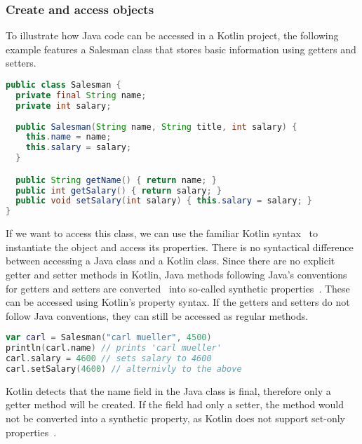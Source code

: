 \documentclass[a4paper,11pt]{article}
\begin{document}
\subsubsection{Create and access objects}
To illustrate how Java code can be accessed in a Kotlin project, the following example features a Salesman class that stores basic information using getters and setters.
\begin{lstlisting}[language=Java,title={Example Java class}]
public class Salesman {
  private final String name;
  private int salary;
  
  public Salesman(String name, String title, int salary) {
    this.name = name;
    this.salary = salary;
  }

  public String getName() { return name; }
  public int getSalary() { return salary; }
  public void setSalary(int salary) { this.salary = salary; }
}
\end{lstlisting}
If we want to access this class, we can use the familiar Kotlin syntax~\cite{interop} to instantiate the object and access its properties. There is no syntactical difference between accessing a Java class and a Kotlin class. Since there are no explicit getter and setter methods in Kotlin, Java methods following Java's conventions for getters and setters are converted~\cite{interop-getter-setter} into so-called synthetic properties~\cite{interop-synthetic-property}. These can be accessed using Kotlin’s property syntax. If the getters and setters do not follow Java conventions, they can still be accessed as regular methods.
\begin{lstlisting}[language=Kotlin, title={Access a Salesman instance in Kotlin}]
var carl = Salesman("carl mueller", 4500)
println(carl.name) // prints 'carl mueller'
carl.salary = 4600 // sets salary to 4600
carl.setSalary(4600) // alternivly to the above
\end{lstlisting}
Kotlin detects that the name field in the Java class is final, therefore only a getter method will be created. If the field had only a setter, the method would not be converted into a synthetic property, as Kotlin does not support set-only properties~\cite{interop-synthetic-property}.
\end{document}
